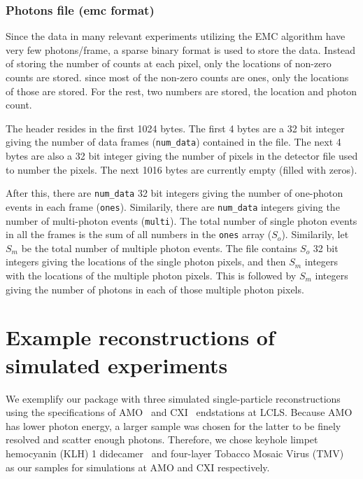 \documentclass[]{iucr}              %
\begin{document}
\subsubsection{Photons file (emc format)}
\label{subsec:emcformat}
Since the data in many relevant experiments utilizing the EMC algorithm have very few photons/frame, a sparse binary format is used to store the data. Instead of storing the number of counts at each pixel, only the locations of non-zero counts are stored. since most of the non-zero counts are ones, only the locations of those are stored. For the rest, two numbers are stored, the location and photon count. 

The header resides in the first 1024 bytes. The first 4 bytes are a 32 bit integer giving the number of data frames (\texttt{num\_data}) contained in the file. The next 4 bytes are also a 32 bit integer giving the number of pixels in the detector file used to number the pixels. The next 1016 bytes are currently empty (filled with zeros).

After this, there are \texttt{num\_data} 32 bit integers giving the number of one-photon events in each frame (\texttt{ones}). Similarily, there are \texttt{num\_data} integers giving the number of multi-photon events (\texttt{multi}). The total number of single photon events in all the frames is the sum of all numbers in the \texttt{ones} array ($S_o$). Similarily, let $S_m$ be the total number of multiple photon events. The file contains $S_o$ 32 bit integers giving the locations of the single photon pixels, and then $S_m$ integers with the locations of the multiple photon pixels. This is followed by $S_m$ integers giving the number of photons in each of those multiple photon pixels. 

\section{Example reconstructions of simulated experiments}

We exemplify our package with three simulated single-particle reconstructions using the specifications of AMO~\cite{ferguson2015} and CXI~\cite{liang2015} endstations at LCLS. Because AMO has lower photon energy, a larger sample was chosen for the latter to be finely resolved and scatter enough photons. Therefore, we chose keyhole limpet hemocyanin (KLH) 1 didecamer~\cite{gatsogiannis2009} and four-layer Tobacco Mosaic Virus (TMV)~\cite{bhyravbhatla1998} as our samples for simulations at AMO and CXI respectively.
\end{document}
